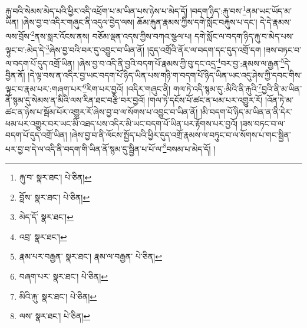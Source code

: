 རྐུ་བའི་སེམས་མེད་པའི་ཕྱིར་འདི་འཕྲོག་པ་མ་ཡིན་པས་ཉེས་པ་མེད་དོ། །བདག་ཉིད་:རྐུ་བས་\footnote{རྐུ་བ་  སྣར་ཐང་།  པེ་ཅིན། }ནམ་ཡང་ཡོད་མ་ཡིན། །ཞེས་བྱ་བ་འདིར་གཞུང་ནི་འདུལ་བྱེད་ལས། ཆོམ་རྐུན་རྣམས་ཀྱིས་དགེ་སློང་བརྐུས་པ་དང་། དེ་དེ་རྣམས་ལས་བྲོས་\footnote{བློས་  སྣར་ཐང་།  པེ་ཅིན། }ནས་སླར་འོངས་ནས། བཅོམ་ལྡན་འདས་ཀྱིས་བཀའ་སྩལ་པ། དགེ་སློང་ལ་བདག་ཉིད་རྐུ་བ་མེད་པས་ལྟུང་བ་:མེད་དེ་\footnote{མེད་དོ་  སྣར་ཐང་། }ཞེས་བྱ་བའི་བར་དུ་འབྱུང་བ་ཡིན་ནོ། །དུད་འགྲོའི་ནོར་ལ་བདག་དང་དུད་འགྲོ་དག །ཟས་བཏང་བ་ལ་བདག་པོ་དུད་འགྲོ་ཡིན། །ཞེས་བྱ་བ་འདི་ནི་བྱའི་བདག་པོ་རྣམས་ཀྱི་བུ་དང་འདྲ་\footnote{འབྲ་  སྣར་ཐང་། }བར་བྱ་:རྣམས་ལ་རྒྱན་\footnote{རྣམ་པར་བརྒྱན་  སྣར་ཐང་། རྣམ་ལ་བརྒྱན་  པེ་ཅིན། }དེ་བྱིན་ནོ། །དེ་ལྟ་བས་ན་འདིར་བྱ་ཡང་བདག་པོ་ཉིད་ཡིན་པས་གཉི་ག་བདག་པོ་ཉིད་ཡིན་ཡང་འདུ་ཤེས་ཀྱི་དབང་གིས་ལྟུང་བ་རྣམ་པར་:གཞག་པར་\footnote{བཞག་པར་  སྣར་ཐང་།  པེ་ཅིན། }རིག་པར་བྱའོ། །འདིར་གཞུང་ནི། གལ་ཏེ་འདི་སྙམ་དུ་:མིའི་ནི་རྐུའི་\footnote{མིའི་རྐུ་  སྣར་ཐང་།  པེ་ཅིན། }བྱའི་ནི་མ་ཡིན་ནོ་སྙམ་དུ་སེམས་ན་མིའི་ལས་རིན་ཐང་བརྩི་བར་བྱའོ། །གལ་ཏེ་དངོས་པོ་ཚང་ན་ཕམ་པར་འགྱུར་རོ། །འོན་ཏེ་མ་ཚང་ན་ཉེས་པ་སྦོམ་པོར་འགྱུར་རོ་ཞེས་བྱ་བ་ལ་སོགས་པ་འབྱུང་བ་ཡིན་ནོ། །མི་བདག་པོ་ཉིད་མ་ཡིན་ན་ནི་དེར་ཕམ་པར་འགྱུར་བར་ཡང་མི་འཐད་པས་འདིར་མི་ཡང་བདག་པོ་ཡིན་པར་རྟོགས་པར་བྱའོ། །ཟས་བཏང་བ་ལ་བདག་པོ་དུད་འགྲོ་ཡིན། །ཞེས་བྱ་བ་ནི་ལོངས་སྤྱོད་པའི་ཕྱིར་དུད་འགྲོ་རྣམས་ལ་བཏུང་བ་ལ་སོགས་པ་གང་སྦྱིན་པར་བྱ་བ་དེ་ལ་འདི་ནི་བདག་གི་ཡིན་ནོ་སྙམ་དུ་སྦྱིན་པ་པོ་ལ་\footnote{ལས་  སྣར་ཐང་།  པེ་ཅིན། }བསམ་པ་མེད་དོ། །
